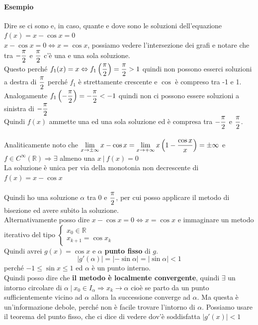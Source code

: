 \documentclass[10pt]{book}
\begin{document}
\paragraph{Esempio} Dire se ci sono e, in caso, quante e dove sono le soluzioni dell'equazione $f(x) = x - \cos x = 0$\\
$x - \cos x = 0 \Leftrightarrow x = \cos x$, possiamo vedere l'intersezione dei grafi e notare che tra $-\mathlarger{\frac{\pi}{2}}$ e $\mathlarger{\frac{\pi}{2}}$ c'è una e una sola soluzione.\\
Questo perché $f_1(x) = x \Leftrightarrow f_1\left(\mathlarger{\frac{\pi}{2}}\right) = \mathlarger{\frac{\pi}{2}} > 1$ quindi non possono esserci soluzioni a destra di $\mathlarger{\frac{\pi}{2}}$ perché $f_1$ è strettamente crescente e $\cos$ è compreso tra -1 e 1.\\
Analogamente $f_1\left(-\mathlarger{\frac{\pi}{2}}\right) = -\mathlarger{\frac{\pi}{2}} < -1$ quindi non ci possono essere soluzioni a sinistra di $-\mathlarger{\frac{\pi}{2}}$\\
Quindi $f(x)$ ammette una ed una sola soluzione ed è compresa tra $-\mathlarger{\frac{\pi}{2}}$ e $\mathlarger{\frac{\pi}{2}}$.\\\\
Analiticamente noto che $\mathlarger{\lim_{x\to\pm\infty} x - \cos x = \lim_{x\to+\infty} x\left(1 - \frac{\cos x}{x}\right) = \pm\infty}$ e $f\in C^\infty(\mathbb{R}) \Rightarrow \exists$ almeno una $x\:|\:f(x) = 0$\\
La soluzione è unica per via della monotonia non decrescente di $f(x) = x - \cos x$\\\\
Quindi ho una soluzione $\alpha$ tra $0$ e $\mathlarger{\frac{\pi}{2}}$, per cui posso applicare il metodo di bisezione ed avere subito la soluzione.\\
Alternativamente posso dire $x - \cos x = 0 \Leftrightarrow x = \cos x$ e immaginare un metodo iterativo del tipo $\left\{\begin{array}{l}
x_0 \in \mathbb{R}\\
x_{k+1} = \cos x_k
\end{array} \right.$\\
Quindi avrei $g(x) = \cos x$ e $\alpha$ \textbf{punto fisso} di $g$.
$$|g'(\alpha)| = |-\sin \alpha| = |\sin \alpha| < 1$$ perché $-1 \leq \sin x \leq 1$ 
ed $\alpha$ è un punto interno.\\
Quindi posso dire che \textbf{il metodo è localmente convergente}, quindi $\exists$ un intorno circolare di $\alpha\:|\:x_0\in I_\alpha \Rightarrow x_k \rightarrow \alpha$ cioè se parto da un punto sufficientemente vicino ad $\alpha$ allora la successione converge ad $\alpha$. Ma questa è un'informazione debole, perché non è facile trovare l'intorno di $\alpha$. Possiamo usare il teorema del punto fisso, che ci dice di vedere dov'è soddisfatta $|g'(x)|<1$
\end{document}
